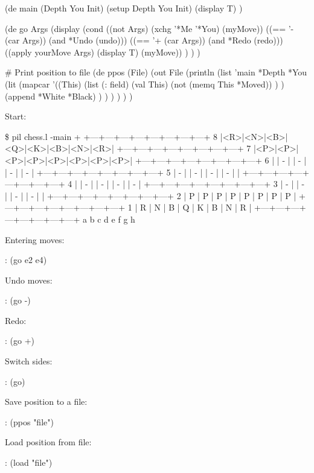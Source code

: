 \begin{wideverbatim}

 
(de main (Depth You Init)
   (setup Depth You Init)
   (display T) )
 
(de go Args
   (display
      (cond
         ((not Args) (xchg '*Me '*You) (myMove))
         ((== '- (car Args)) (and *Undo (undo)))
         ((== '+ (car Args)) (and *Redo (redo)))
         ((apply yourMove Args) (display T) (myMove)) ) ) )
 
# Print position to file
(de ppos (File)
   (out File
      (println
         (list 'main *Depth *You
            (lit
               (mapcar
                  '((This)
                     (list
                        (: field)
                        (val This)
                        (not (memq This *Moved)) ) )
                  (append *White *Black) ) ) ) ) ) )



\end{wideverbatim}

\begin{wideverbatim}


Start:

\$ pil chess.l -main +
   +---+---+---+---+---+---+---+---+
 8 |<R>|<N>|<B>|<Q>|<K>|<B>|<N>|<R>|
   +---+---+---+---+---+---+---+---+
 7 |<P>|<P>|<P>|<P>|<P>|<P>|<P>|<P>|
   +---+---+---+---+---+---+---+---+
 6 |   | - |   | - |   | - |   | - |
   +---+---+---+---+---+---+---+---+
 5 | - |   | - |   | - |   | - |   |
   +---+---+---+---+---+---+---+---+
 4 |   | - |   | - |   | - |   | - |
   +---+---+---+---+---+---+---+---+
 3 | - |   | - |   | - |   | - |   |
   +---+---+---+---+---+---+---+---+
 2 | P | P | P | P | P | P | P | P |
   +---+---+---+---+---+---+---+---+
 1 | R | N | B | Q | K | B | N | R |
   +---+---+---+---+---+---+---+---+
     a   b   c   d   e   f   g   h


\end{wideverbatim}

\begin{wideverbatim}

Entering moves:

: (go e2 e4)

Undo moves:

: (go -)

Redo:

: (go +)

Switch sides:

: (go)

Save position to a file:

: (ppos "file")

Load position from file:

: (load "file")

\end{wideverbatim}

